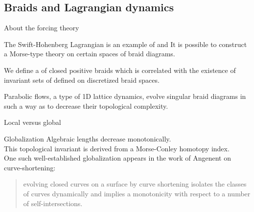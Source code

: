 \documentclass[9pt, english]{beamer}
\theoremstyle{definition}
\begin{document}
\subsection{Braids and Lagrangian dynamics}
\begin{frame}{About the forcing theory}
    \begin{block}{The Swift-Hohenberg Lagrangian}\pause
        is an example of  \pause and  \pause It is possible to construct a
        Morse-type theory on certain spaces of braid diagrams.\pause

        We define a  of closed positive braids which
        is correlated with the existence of invariant sets of  defined on discretized braid spaces.\pause

        Parabolic flows, a type of 1D lattice dynamics, evolve singular braid diagrams in
        such a way as to decrease their topological complexity.
    \end{block}
\end{frame}
\begin{frame}{Local versus global}
    \begin{block}{Globalization}\pause
        Algebraic lengths decrease monotonically.\pause \\ This topological
        invariant is derived from a Morse-Conley homotopy index.\pause \\
        One such well-established globalization appears in the work
        of Angenent on curve-shortening:
        \begin{quote}
        \alert {evolving closed curves on a surface by curve
        shortening isolates the classes of curves dynamically and
        implies a monotonicity with respect to a number of
        self-intersections.}
        \end{quote}
    \end{block}

\end{frame}
\end{document}
